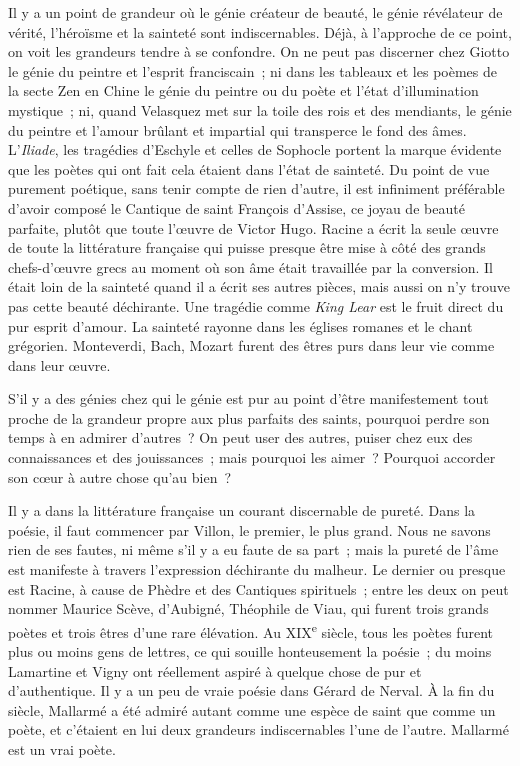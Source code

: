 \documentclass[french,twoside]{book} %
\begin{document}
Il y a un point de grandeur où le génie créateur de beauté, le génie révélateur de vérité, l'héroïsme et la sainteté sont indiscernables. Déjà, à l'approche de ce point, on voit les grandeurs tendre à se confondre. On ne peut pas discerner chez Giotto le génie du peintre et l'esprit franciscain ; ni dans les tableaux et les poèmes de la secte Zen en Chine le génie du peintre ou du poète et l'état d'illumination mystique ; ni, quand Velasquez met sur la toile des rois et des mendiants, le génie du peintre et l'amour brûlant et impartial qui transperce le fond des âmes. L'{\itshape Iliade}, les tragédies d'Eschyle et celles de Sophocle portent la marque évidente que les poètes qui ont fait cela étaient dans l'état de sainteté. Du point de vue purement poétique, sans tenir compte de rien d'autre, il est infiniment préférable d'avoir composé le Cantique de saint François d'Assise, ce joyau de beauté parfaite, plutôt que toute l'œuvre de Victor Hugo. Racine a écrit la seule œuvre de toute la littérature française qui puisse presque être mise à côté des grands chefs-d'œuvre grecs au moment où son âme était travaillée par la conversion. Il était loin de la sainteté quand il a écrit ses autres pièces, mais aussi on n'y trouve pas cette beauté déchirante. Une tragédie comme {\itshape King Lear} est le fruit direct du pur esprit d'amour. La sainteté rayonne dans les églises romanes et le chant grégorien. Monteverdi, Bach, Mozart furent des êtres purs dans leur vie comme dans leur œuvre.\par
S'il y a des génies chez qui le génie est pur au point d'être manifestement tout proche de la grandeur propre aux plus parfaits des saints, pourquoi perdre son temps à en admirer d'autres ? On peut user des autres, puiser chez eux des connaissances et des jouissances ; mais pourquoi les aimer ? Pourquoi accorder son cœur à autre chose qu'au bien ?\par
Il y a dans la littérature française un courant discernable de pureté. Dans la poésie, il faut commencer par Villon, le premier, le plus grand. Nous ne savons rien de ses fautes, ni même s'il y a eu faute de sa part ; mais la pureté de l'âme est manifeste à travers l'expression déchirante du malheur. Le dernier ou presque est Racine, à cause de Phèdre et des Cantiques spirituels ; entre les deux on peut nommer Maurice Scève, d'Aubigné, Théophile de Viau, qui furent trois grands poètes et trois êtres d'une rare élévation. Au XIX\textsuperscript{e} siècle, tous les poètes furent plus ou moins gens de lettres, ce qui souille honteusement la poésie ; du moins Lamartine et Vigny ont réellement aspiré à quelque chose de pur et d'authentique. Il y a un peu de vraie poésie dans Gérard de Nerval. À la fin du siècle, Mallarmé a été admiré autant comme une espèce de saint que comme un poète, et c'étaient en lui deux grandeurs indiscernables l'une de l'autre. Mallarmé est un vrai poète.\par
\end{document}
